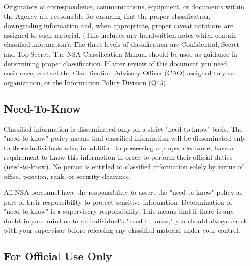\documentclass[a4]{article}
\begin{document}
Originators of correspondence, communications, equipment, or documents within
the Agency are responsible for ensuring that the proper classification,
downgrading information and, when appropriate, proper caveat notations are
assigned to such material.  (This includes any handwritten notes which contain
classified information).  The three levels of classification are Confidential,
Secret and Top Secret.  The NSA Classification Manual should be used as
guidance in determining proper classification.  If after review of this
document you need assistance, contact the Classification Advisory Officer
(CAO) assigned to your organization, or the Information Policy Division (Q43).

\subsection{Need-To-Know}

Classified information is disseminated only on a strict "need-to-know" basis.
The "need-to-know" policy means that classified information will be
disseminated only to those individuals who, in addition to possessing a proper
clearance, have a requirement to know this information in order to perform
their official duties (need-to-know).  No person is entitled to classified
information solely by virtue of office, position, rank, or security clearance.

All NSA personnel have the responsibility to assert the "need-to-know" policy
as part of their responsibility to protect sensitive information.
Determination of "need-to-know" is a supervisory responsibility.  This means
that if there is any doubt in your mind as to an individual's "need-to-know,"
you should always check with your supervisor before releasing any classified
material under your control.

\subsection{For Official Use Only}
\end{document}
